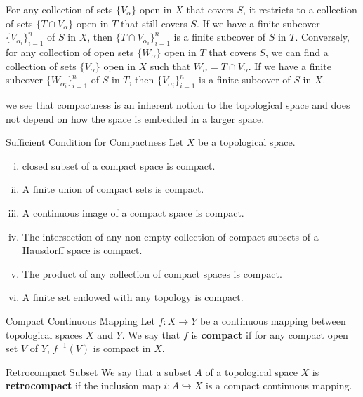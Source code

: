 \documentclass{report}
\begin{document}
\begin{prf}
	For any collection of sets $\{V_\alpha\}$ open in $X$ that covers $S$, it restricts to a collection of sets $\{T\cap V_\alpha\}$ open in $T$ that still covers $S$. If we have a finite subcover $\{V_{\alpha_i}\}_{i=1}^n$ of $S$ in $X$, then $\{T\cap V_{\alpha_i}\}_{i=1}^n$ is a finite subcover of $S$ in $T$. Conversely, for any collection of open sets $\{W_\alpha\}$ open in $T$ that covers $S$, we can find a collection of sets $\{V_\alpha\}$ open in $X$ such that $W_\alpha=T\cap V_\alpha$. If we have a finite subcover $\{W_{\alpha_i}\}_{i=1}^n$ of $S$ in $T$, then $\{V_{\alpha_i}\}_{i=1}^n$ is a finite subcover of $S$ in $X$.
\end{prf}

we see that compactness is an inherent notion to the topological space and does not depend on how the space is embedded in a larger space.

\begin{proposition}{Sufficient Condition for Compactness}{}
	Let $X$ be a topological space. 
	\begin{enumerate}[(i)]
		\item closed subset of a compact space is compact.
		\item A finite union of compact sets is compact.
		\item A continuous image of a compact space is compact.
		\item The intersection of any non-empty collection of compact subsets of a Hausdorff space is compact.
		\item The product of any collection of compact spaces is compact. 
		\item A finite set endowed with any topology is compact.
	\end{enumerate}
\end{proposition}


\begin{definition}{Compact Continuous Mapping}{}
	Let $f:X\to Y$ be a continuous mapping between topological spaces $X$ and $Y$. We say that $f$ is \textbf{compact} if for any compact open set $V$ of $Y$, $f^{-1}(V)$ is compact in $X$.
\end{definition}

\begin{definition}{Retrocompact Subset}{}
	We say that a subset $A$ of a topological space $X$ is \textbf{retrocompact} if the inclusion map $i:A\hookrightarrow X$ is a compact continuous mapping.
\end{definition}
\end{document}
